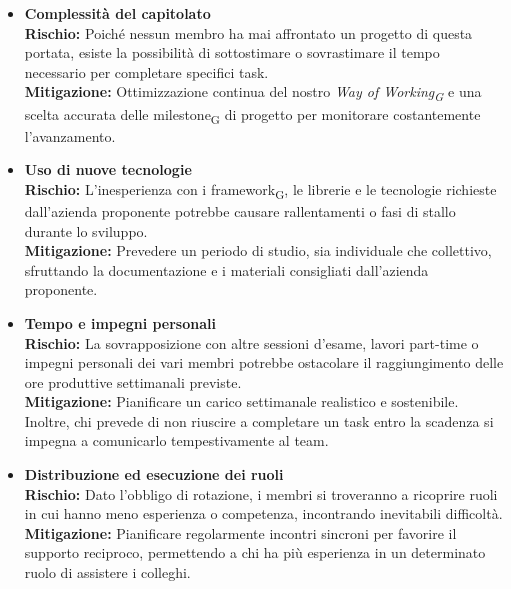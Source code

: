 \documentclass[11pt, a4paper]{article}
\begin{document}
	\begin{itemize}
		\item \textbf{Complessità del capitolato}\\
		\textbf{Rischio:} Poiché nessun membro ha mai affrontato un progetto di questa portata, esiste la possibilità di sottostimare o sovrastimare il tempo necessario per completare specifici task.\\
		\textbf{Mitigazione:} Ottimizzazione continua del nostro \textit{Way of Working\textsubscript{G}} e una scelta accurata delle milestone\textsubscript{G} di progetto per monitorare costantemente l'avanzamento.
		
		\vspace{0.3cm}
		\item \textbf{Uso di nuove tecnologie}\\
		\textbf{Rischio:} L'inesperienza con i framework\textsubscript{G}, le librerie e le tecnologie richieste dall'azienda proponente potrebbe causare rallentamenti o fasi di stallo durante lo sviluppo.\\
		\textbf{Mitigazione:} Prevedere un periodo di studio, sia individuale che collettivo, sfruttando la documentazione e i materiali consigliati dall'azienda proponente.
		
		\vspace{0.3cm}
		\item \textbf{Tempo e impegni personali}\\
		\textbf{Rischio:} La sovrapposizione con altre sessioni d'esame, lavori part-time o impegni personali dei vari membri potrebbe ostacolare il raggiungimento delle ore produttive settimanali previste.\\
		\textbf{Mitigazione:} Pianificare un carico settimanale realistico e sostenibile. Inoltre, chi prevede di non riuscire a completare un task entro la scadenza si impegna a comunicarlo tempestivamente al team.
		
		\vspace{0.3cm}
		\item \textbf{Distribuzione ed esecuzione dei ruoli}\\
		\textbf{Rischio:} Dato l'obbligo di rotazione, i membri si troveranno a ricoprire ruoli in cui hanno meno esperienza o competenza, incontrando inevitabili difficoltà.\\
		\textbf{Mitigazione:} Pianificare regolarmente incontri sincroni per favorire il supporto reciproco, permettendo a chi ha più esperienza in un determinato ruolo di assistere i colleghi.
	\end{itemize}
	
\end{document}
